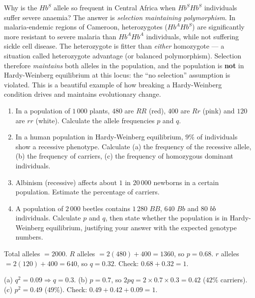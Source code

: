 \documentclass[11pt]{article}
\newcommand{\cle}[1]{{\popxbold\color{popdark}#1}}
\begin{document}
\begin{savaistu}
Why is the $Hb^S$ allele so frequent in Central Africa when $Hb^S Hb^S$ individuals suffer severe anaemia? The answer is \emph{selection maintaining polymorphism}. In malaria-endemic regions of Cameroon, heterozygotes ($Hb^A Hb^S$) are significantly more resistant to severe malaria than $Hb^A Hb^A$ individuals, while not suffering sickle cell disease. The heterozygote is fitter than \emph{either} homozygote --- a situation called \cle{heterozygote advantage} (or balanced polymorphism). Selection therefore \emph{maintains} both alleles in the population, and the population is \textbf{not} in Hardy-Weinberg equilibrium at this locus: the ``no selection'' assumption is violated. This is a beautiful example of how breaking a Hardy-Weinberg condition drives and maintains evolutionary change.
\end{savaistu}

\begin{exercice}[Practice]
\begin{enumerate}
\item In a population of $1\,000$ plants, $480$ are $RR$ (red), $400$ are $Rr$ (pink) and $120$ are $rr$ (white). Calculate the allele frequencies $p$ and $q$.
\item In a human population in Hardy-Weinberg equilibrium, $9\%$ of individuals show a recessive phenotype. Calculate (a) the frequency of the recessive allele, (b) the frequency of carriers, (c) the frequency of homozygous dominant individuals.
\item Albinism (recessive) affects about $1$ in $20\,000$ newborns in a certain population. Estimate the percentage of carriers.
\item A population of $2\,000$ beetles contains $1\,280$ $BB$, $640$ $Bb$ and $80$ $bb$ individuals. Calculate $p$ and $q$, then state whether the population is in Hardy-Weinberg equilibrium, justifying your answer with the expected genotype numbers.
\end{enumerate}
\end{exercice}

\begin{corrige}[Exercise 1]
Total alleles $= 2000$. $R$ alleles $= 2(480) + 400 = 1360$, so $p = 0.68$. $r$ alleles $= 2(120) + 400 = 640$, so $q = 0.32$. Check: $0.68 + 0.32 = 1$.
\end{corrige}

\begin{corrige}[Exercise 2]
(a) $q^2 = 0.09 \Rightarrow q = 0.3$. (b) $p = 0.7$, so $2pq = 2 \times 0.7 \times 0.3 = 0.42$ ($42\%$ carriers). (c) $p^2 = 0.49$ ($49\%$). Check: $0.49 + 0.42 + 0.09 = 1$.
\end{corrige}
\end{document}
